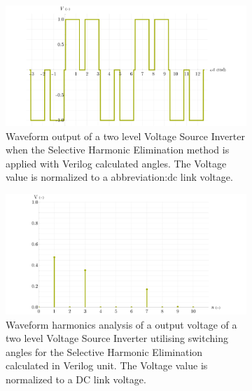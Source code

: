 \documentclass[a4paper, twoside, 11pt]{article}
\begin{document}
            \begin{figure}[htbp!]
                \centering
                \begin{subfigure}[t]{0.45\textwidth}
                    \includegraphics[width=1\textwidth]{src/png/VerilogPlotWaveform.png}
                    \caption{Waveform output of a two level Voltage Source Inverter when the Selective Harmonic Elimination method is applied with Verilog calculated angles. The Voltage value is normalized to a \gls{abbreviation:dc} link voltage.}
                    \label{fig:VerilogPlotWaveform}
                \end{subfigure}
                \hspace{0.05\textwidth}
                \begin{subfigure}[t]{0.45\textwidth}
                    \includegraphics[width=1\textwidth]{src/png/VerilogPlotHarmonics.png}
                    \caption{Waveform harmonics analysis of a output voltage of a two level Voltage Source Inverter utilising switching angles for the Selective Harmonic Elimination calculated in Verilog unit. The Voltage value is normalized to a DC link voltage.}
                    \label{fig:VerilogPlotHarmonics}
                \end{subfigure}
                \caption{}
            \end{figure}
\end{document}
